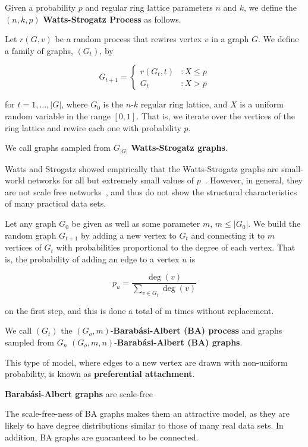\begin{definition}
  Given a probability $p$ and regular ring lattice parameters $n$ and $k$, we
  define the $(n,k,p)$ \textbf{Watts-Strogatz Process} as follows.

  Let $r(G,v)$ be a random process that rewires vertex $v$ in a graph $G$. We
  define a family of graphs, $(G_t)$, by

  \[
    G_{t+1} = \left\{
      \begin{array}{lc}
        r(G_t,t) &: X \leq p \\
        G_t &: X > p
      \end{array}
    \right.
  \]

  for $t = 1,\dots, |G|$, where $G_0$ is the $n$-$k$ regular ring lattice, and
  $X$ is a uniform random variable in the range $[0,1]$. That is, we iterate
  over the vertices of the ring lattice and rewire each one with probability
  $p$.

  We call graphs sampled from $G_{|G|}$ \textbf{Watts-Strogatz graphs}.
\end{definition}

Watts and Strogatz showed empirically that the Watts-Strogatz graphs are small-world networks for all
but extremely small values of $p$~\cite{Watts1998Collective}. However, in general, they are not scale
free networks~\cite{Barabasi509}, and thus do not show the structural characteristics of many
practical data sets.

\begin{definition}
  \label{def:ba}
  Let any graph $G_0$ be given as well as some parameter $m$, $m \leq |G_0|$. We
  build the random graph $G_{t+1}$ by adding a new vertex to $G_t$ and
  connecting it to $m$ vertices of $G_t$ with probabilities proportional to the
  degree of each vertex. That is, the probability of adding an edge to a vertex
  $u$ is

  \[
    p_u = \frac{\deg(v)}{\sum_{v \in G_t} \deg(v)}
  \]

  on the first step, and this is done a total of m times without replacement.

  We call $(G_t)$ the $(G_o,m)$-\textbf{Barab\'asi-Albert (BA) process} and graphs
  sampled from $G_n$ $(G_o,m,n)$-\textbf{Barab\'asi-Albert (BA) graphs}.
\end{definition}

This type of model, where edges to a new vertex are drawn with non-uniform
probability, is known as \textbf{preferential attachment}.

\begin{theorem}
  \textbf{Barab\'asi-Albert graphs} are scale-free
\end{theorem}

The scale-free-ness of BA graphs makes them an attractive model, as they are likely to have degree
distributions similar to those of many real data sets. In addition, BA graphs are guaranteed to be
connected.

